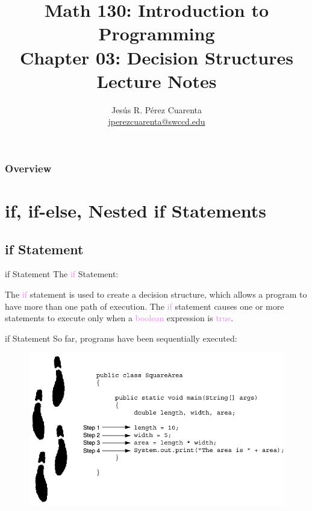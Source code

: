 \documentclass[11pt]{beamer}
\title[Chapter 03 Notes]{Math 130: Introduction to Programming \\ Chapter 03: Decision Structures \\ Lecture Notes}
\author{Jesús R. Pérez Cuarenta \\
\href{mailto:jperezcuarenta@swccd.edu}{jperezcuarenta@swccd.edu}
}
\date{}
\newcommand{\violet}[1]{\textcolor{violet}{#1}}
\begin{document}
\section{}
\begin{frame}
  \maketitle
\end{frame}

\begin{frame}
\frametitle{Overview}
    \begin{multicols}{2}
    \tableofcontents
    \end{multicols}
\end{frame}

\section{if, if-else, Nested if Statements}
\subsection{if Statement}
\begin{frame}{if Statement}
    The \violet{if} Statement:
        \begin{center}
        The \violet{if} statement is used to create a decision structure, which allows a program to have more than one path of execution. The \violet{if} statement causes one or more statements to execute only when a \violet{boolean} expression is \violet{true}.
        \end{center}
\end{frame}

\begin{frame}{if Statement}
    So far, programs have been sequentially executed:
        \noindent 
        \begin{figure}[H]
        \centering
        \includegraphics[scale=0.35]{Images/chapter03_sequentialCode.png}
        \end{figure}
\end{frame}
\end{document}
